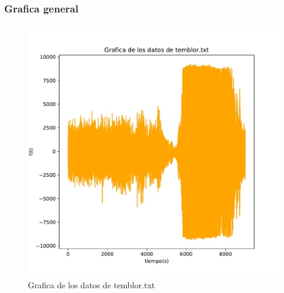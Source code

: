 \documentclass[11pt,letterpaper]{exam}
\begin{document}
\subsubsection{Grafica general}
\begin{figure}[H]
    \centering
    \includegraphics[width=1.1\textwidth]{Temblor.pdf}
    \caption{Grafica de los datos de temblor.txt}
    \label{fig:my_label}
\end{figure}
\end{document}
